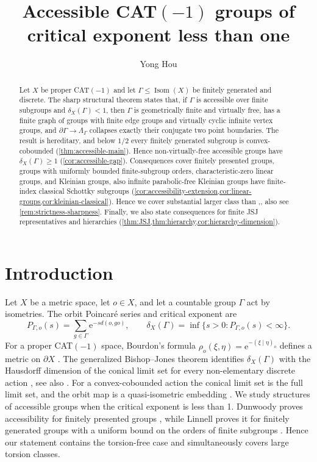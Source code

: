 \documentclass[11pt]{article}
\title{Accessible CAT$(-1)$ groups of  critical exponent less than one}
\author{Yong Hou}
\date{}
\theoremstyle{definition}
\newcommand{\Isom}{\operatorname{Isom}}
\newcommand{\e}{\mathrm e}
\begin{document}
\maketitle

\begin{abstract}
Let $X$ be proper CAT$(-1)$ and let $\Gamma\le\Isom(X)$ be finitely generated and discrete.
The sharp structural theorem states that, if $\Gamma$ is accessible over finite subgroups and
$\delta_X(\Gamma)<1$, then $\Gamma$ is geometrically finite and virtually free, has a finite
graph of groups with finite edge groups and virtually cyclic infinite vertex groups, and
$\partial\Gamma\to\Lambda_\Gamma$ collapses exactly their conjugate two point boundaries.
The result is hereditary, and below $1/2$ every finitely generated subgroup is
convex-cobounded (\cref{thm:accessible-main}).  Hence non-virtually-free accessible groups
have $\delta_X(\Gamma)\ge1$ (\cref{cor:accessible-gap}).  Consequences cover finitely
presented groups, groups with uniformly bounded finite-subgroup orders, characteristic-zero
linear groups, and Kleinian groups, also infinite parabolic-free Kleinian groups have finite-index
classical Schottky subgroups
(\cref{cor:accessibility-extension,cor:linear-groups,cor:kleinian-classical}). Hence we cover substantial larger class than \cite{LiuWang2023},\cite{Hou2001}, also see \cref{rem:strictness-sharpness}. Finally, we also state consequences for finite JSJ representatives and hierarchies (\cref{thm:JSJ,thm:hierarchy,cor:hierarchy-dimension}).

\end{abstract}
\setcounter{tocdepth}{1}

\tableofcontents

\section{Introduction}


Let $X$ be a metric space, let $o\in X$, and let a countable group $\Gamma$ act by
isometries.  The orbit Poincar\'e series and critical exponent are
\[
 P_{\Gamma,o}(s)=\sum_{g\in\Gamma}\e^{-s d(o,go)},
 \qquad
 \delta_X(\Gamma)=\inf\{s>0:P_{\Gamma,o}(s)<\infty\}.
\]
For a proper CAT$(-1)$ space, Bourdon's formula
$\rho_o(\xi,\eta)=\e^{-(\xi\mid\eta)_o}$ defines a metric on $\partial X$
\cite{Bourdon1995}.  The generalized Bishop--Jones theorem identifies
$\delta_X(\Gamma)$ with the Hausdorff dimension of the conical limit set for every
non-elementary discrete action \cite[Theorem~1.2.1]{DasSimmonsUrbanski2017}, see also
\cite{Cavallucci2025}.  For a convex-cobounded action the conical limit set is the full limit
set, and the orbit map is a quasi-isometric embedding
\cite[Theorems~12.2.7 and~12.2.12]{DasSimmonsUrbanski2017}.
 We study structures of accessible groups when the critical exponent is less than 1. Dunwoody proves accessibility for finitely presented
 groups \cite{Dunwoody1985}, while Linnell proves it for finitely generated groups with a
uniform bound on the orders of finite subgroups \cite{Linnell1983}.  Hence our statement
contains the torsion-free case and simultaneously covers large torsion classes. 
\end{document}
